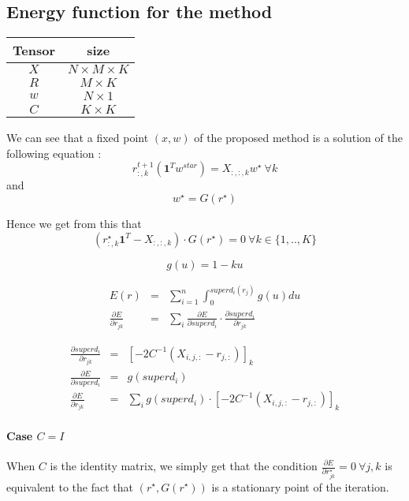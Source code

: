 \subsection*{Energy function for the method}

\begin{tabular}{|c|c|}
\hline 
Tensor & size\\
\hline
$X$ & $N\times M \times K$\\
\hline
$R$ & $M\times K$\\
\hline
$w$ & $N\times 1$\\
\hline
$C$ & $K\times K$\\
\hline
\end{tabular}

We can see that a fixed point $(x,w)$ of the proposed method is a solution of the following equation :
$$ r_{:,k}^{t+1} (\mathbf{1}^Tw^{star}) = X_{:,:,k}w^{\star} \: \forall k$$
and 
$$ w^{\star} = G(r^{\star})$$

Hence we get from this that
$$(r_{:,k}^{\star} \mathbf{1}^T - X_{:,:,k})\cdot G(r^{\star}) = 0 \: \forall k\in \{1,..,K\}$$


$$g(u) = 1 -ku$$

\begin{eqnarray*}
E(r) & = & \sum_{i=1}^n \int_0^{superd_i(r_j)}g(u) du\\
\frac{\partial E}{\partial r_{jk}} & = & \sum_{i}\frac{\partial E}{\partial superd_i} \cdot \frac{\partial superd_i}{\partial r_{jk}}
\end{eqnarray*}

\begin{eqnarray*}
\frac{\partial superd_i}{\partial r_{jk}} & = & \left[-2 C^{-1}(X_{i,j,:}-r_{j,:})\right]_{k} \\
\frac{\partial E}{\partial superd_i} & = & g(superd_i)\\
\frac{\partial E}{\partial r_{jk}} & = & \sum_{i}g(superd_i) \cdot \left[-2 C^{-1}(X_{i,j,:}-r_{j,:})\right]_{k} 
\end{eqnarray*}

\paragraph{Case $C = I$}

When $C$ is the identity matrix, we simply get that the condition $\frac{\partial E}{\partial r^{\star}_{jk}}=0 \: \forall j,k$ is equivalent to the fact that $(r^{\star},G(r^{\star}))$ is a stationary point of the iteration.





